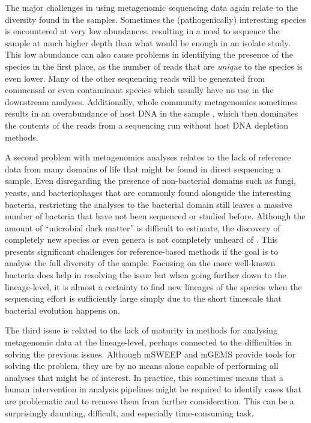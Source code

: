 \documentclass[officiallayout]{tktla}
\begin{document}
The major challenges in using metagenomic sequencing data again relate
to the diversity found in the samples. Sometimes the (pathogenically)
interesting species is encountered at very low abundances, resulting
in a need to sequence the sample at much higher depth than what would
be enough in an isolate study. This low abundance can also cause
problems in identifying the presence of the species in the
first place, as the number of reads that are \textit{unique} to the
species is even lower. Many of the other sequencing reads will be
generated from commensal or even contaminant species which usually
have no use in the downstream analyses. Additionally, whole community
metagenomics sometimes results in an overabundance of host DNA in the
sample \citep{pereira2019impact, mcardle2020sensitivity}, which then
dominates the contents of the reads from a sequencing run without host
DNA depletion methods.

A second problem with metagenomics analyses relates to the lack of
reference data from many domains of life that might be found in direct
sequencing a sample. Even disregarding the presence of non-bacterial
domains such as fungi, yeasts, and bacteriophages that are commonly
found alongside the interesting bacteria, restricting the analyses to
the bacterial domain still leaves a massive number of bacteria that
have not been sequenced or studied before. Although the amount of
``microbial dark matter'' \citep{rinke2013insights} is difficult to
estimate, the discovery of completely new species
\citep{thorpe2021one} or even genera is not completely unheard of
\citep{conle2020studies, pitt2019aquirufa}. This presents significant
challenges for reference-based methods if the goal is to analyse the
full diversity of the sample. Focusing on the more well-known bacteria
does help in resolving the issue but when going further down to the
lineage-level, it is almost a certainty to find new lineages of
the species when the sequencing effort is sufficiently large simply
due to the short timescale that bacterial evolution happens on.

The third issue is related to the lack of maturity in methods for
analysing metagenomic data at the lineage-level, perhaps connected to
the difficulties in solving the previous issues. Although mSWEEP and
mGEMS provide tools for solving the problem, they are by no means
alone capable of performing all analyses that might be of interest. In
practice, this sometimes means that a human intervention in analysis
pipelines might be required to identify cases that are problematic and
to remove them from further consideration. This can be a surprisingly
daunting, difficult, and especially time-consuming task.
\end{document}
